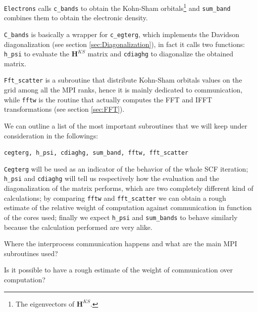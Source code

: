 \documentclass[a4paper,12pt]{article}
\newcommand\mf[1]{\mathbf{#1}}
\begin{document}
\texttt{Electrons} calls \texttt{c\_bands} to obtain the Kohn-Sham orbitals\footnote{The eigenvectors of $\mf{H}^{KS}$.} and \texttt{sum\_band} combines them to obtain the electronic density.

\texttt{C\_bands} is basically a wrapper for \texttt{c\_egterg}, which implements the Davidson diagonalization (see section \ref{sec:Diagonalization}), in fact it calls two functions:
\texttt{h\_psi} to evaluate the $\mf{H}^{KS}$ matrix and \texttt{cdiaghg} to diagonalize the obtained matrix.

\texttt{Fft\_scatter} is a subroutine that distribute Kohn-Sham orbitals values on the grid among all the MPI ranks, hence it is mainly dedicated to communication, while \texttt{fftw} is the routine that actually computes the FFT and IFFT transformations (see section \ref{sec:FFT}).

We can outline a list of the most important subroutines that we will keep under consideration in the followings:

\begin{center}
\texttt{cegterg, h\_psi, cdiaghg, sum\_band, fftw, fft\_scatter} \label{asd:relevantFunctions}
\end{center}

\texttt{Cegterg} will be used as an indicator of the behavior of the whole SCF iteration;
\texttt{h\_psi} and \texttt{cdiaghg} will tell us respectively how the evaluation and the diagonalization of the matrix performs, which are two completely different kind of calculations;
by comparing \texttt{fftw} and \texttt{fft\_scatter} we can obtain a rough estimate of the relative weight of computation against communication in function of the cores used; 
finally we expect \texttt{h\_psi} and \texttt{sum\_bands} to behave similarly because the calculation performed are very alike.





\newpage
\begin{center}
\begin{framed}
Where the interprocess communication happens and what are the main MPI subroutines used? 

Is it possible to have a rough estimate of the weight of communication over computation?
\end{framed}
\end{center}
\end{document}

